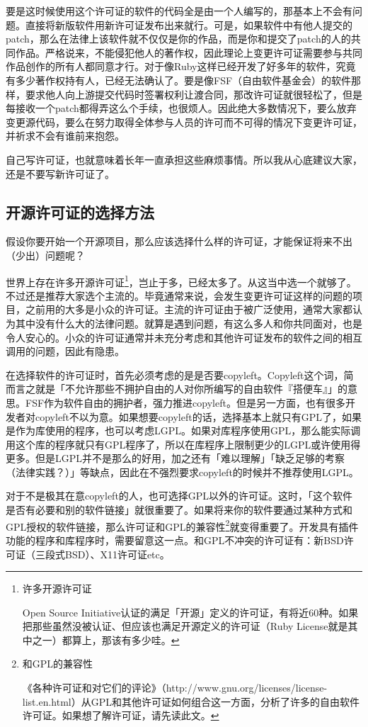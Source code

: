 \documentclass[a4paper,12pt]{article}
\begin{document}
要是这时候使用这个许可证的软件的代码全是由一个人编写的，那基本上不会有问题。直接将新版软件用新许可证发布出来就行。可是，如果软件中有他人提交的patch，那么在法律上该软件就不仅仅是你的作品，而是你和提交了patch的人的共同作品。严格说来，不能侵犯他人的著作权，因此理论上变更许可证需要参与共同作品创作的所有人都同意才行。对于像Ruby这样已经开发了好多年的软件，究竟有多少著作权持有人，已经无法确认了。要是像FSF（自由软件基金会）的软件那样，要求他人向上游提交代码时签署权利让渡合同，那改许可证就很轻松了，但是每接收一个patch都得弄这么个手续，也很烦人。因此绝大多数情况下，要么放弃变更源代码，要么在努力取得全体参与人员的许可而不可得的情况下变更许可证，并祈求不会有谁前来抱怨。

自己写许可证，也就意味着长年一直承担这些麻烦事情。所以我从心底建议大家，还是不要写新许可证了。

\subsection{开源许可证的选择方法}

假设你要开始一个开源项目，那么应该选择什么样的许可证，才能保证将来不出（少出）问题呢？

世界上存在许多开源许可证\footnote{许多开源许可证

Open Source Initiative认证的满足「开源」定义的许可证，有将近60种。如果把那些虽然没被认证、但应该也满足开源定义的许可证（Ruby License就是其中之一）都算上，那该有多少哇。}，岂止于多，已经太多了。从这当中选一个就够了。不过还是推荐大家选个主流的。毕竟通常来说，会发生变更许可证这样的问题的项目，之前用的大多是小众的许可证。主流的许可证由于被广泛使用，通常大家都认为其中没有什么大的法律问题。就算是遇到问题，有这么多人和你共同面对，也是令人安心的。小众的许可证通常并未充分考虑和其他许可证发布的软件之间的相互调用的问题，因此有隐患。

在选择软件的许可证时，首先必须考虑的是是否要copyleft。Copyleft这个词，简而言之就是「不允许那些不拥护自由的人对你所编写的自由软件『搭便车』」的意思。FSF作为软件自由的拥护者，强力推进copyleft。但是另一方面，也有很多开发者对copyleft不以为意。如果想要copyleft的话，选择基本上就只有GPL了，如果是作为库使用的程序，也可以考虑LGPL。如果对库程序使用GPL，那么能实际调用这个库的程序就只有GPL程序了，所以在库程序上限制更少的LGPL或许使用得更多。但是LGPL并不是那么的好用，加之还有「难以理解」「缺乏足够的考察（法律实践？）」等缺点，因此在不强烈要求copyleft的时候并不推荐使用LGPL。

对于不是极其在意copyleft的人，也可选择GPL以外的许可证。这时，「这个软件是否有必要和别的软件链接」就很重要了。如果将来你的软件要通过某种方式和GPL授权的软件链接，那么许可证和GPL的兼容性\footnote{和GPL的兼容性

《各种许可证和对它们的评论》（http://www.gnu.org/licenses/license-list.en.html）从GPL和其他许可证如何组合这一方面，分析了许多的自由软件许可证。如果想了解许可证，请先读此文。}就变得重要了。开发具有插件功能的程序和库程序时，需要留意这一点。和GPL不冲突的许可证有：新BSD许可证（三段式BSD）、X11许可证etc。
\end{document}
